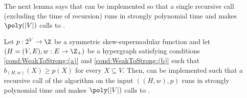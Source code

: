 The next lemma says that  can be implemented so that a single recursive call (excluding the time of recursion) runs in strongly polynomial time and makes $\poly(|V|)$ calls to .
  \begin{lemma}\label{lem:WeakToStrongCover:single-recursive-call-strongly-polytime}
      Let $p:2^V\rightarrow\Z$ be a symmetric skew-supermodular function and let $\left(H = (V, E), w:E \rightarrow\Z_+\right)$ be a hypergraph satisfying conditions \ref{cond:WeakToStrong:(a)} and \ref{cond:WeakToStrong:(b)} such that $b_{(H,w)}(X) \geq p(X)$ for every $X \subseteq V$. Then, 
  can be implemented such that a recursive call of the algorithm on the input $((H,w), p)$ runs in strongly polynomial time and makes $\poly(|V|)$ calls to .
  \end{lemma}  
